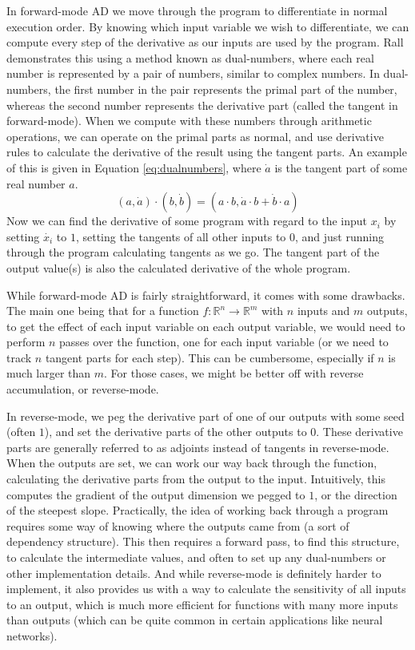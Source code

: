         In forward-mode AD we move through the program to differentiate in normal execution order.
        By knowing which input variable we wish to differentiate, we can compute every step of the derivative as our inputs are used by the program.
        Rall demonstrates this using a method known as dual-numbers, where each real number is represented by a pair of numbers, similar to complex numbers.
        In dual-numbers, the first number in the pair represents the primal part of the number, whereas the second number represents the derivative part (called the tangent in forward-mode).
        When we compute with these numbers through arithmetic operations, we can operate on the primal parts as normal, and use derivative rules to calculate the derivative of the result using the tangent parts.
        An example of this is given in Equation \ref{eq:dualnumbers}, where $\dot{a}$ is the tangent part of some real number $a$.
        \begin{equation} \label{eq:dualnumbers}
            (a,\dot{a})\cdot(b,\dot{b})=(a\cdot b, \dot{a}\cdot b+\dot{b}\cdot a)
        \end{equation}
        Now we can find the derivative of some program with regard to the input $x_i$ by setting $\dot{x_i}$ to $1$, setting the tangents of all other inputs to $0$, and just running through the program calculating tangents as we go.
        The tangent part of the output value(s) is also the calculated derivative of the whole program.

        While forward-mode AD is fairly straightforward, it comes with some drawbacks.
        The main one being that for a function $f:\mathbb{R}^n\to\mathbb{R}^m$ with $n$ inputs and $m$ outputs, to get the effect of each input variable on each output variable, we would need to perform $n$ passes over the function, one for each input variable (or we need to track $n$ tangent parts for each step).
        This can be cumbersome, especially if $n$ is much larger than $m$.
        For those cases, we might be better off with reverse accumulation, or reverse-mode.

        In reverse-mode, we peg the derivative part of one of our outputs with some seed (often $1$), and set the derivative parts of the other outputs to $0$.
        These derivative parts are generally referred to as adjoints instead of tangents in reverse-mode.
        When the outputs are set, we can work our way back through the function, calculating the derivative parts from the output to the input.
        Intuitively, this computes the gradient of the output dimension we pegged to $1$, or the direction of the steepest slope.
        Practically, the idea of working back through a program requires some way of knowing where the outputs came from (a sort of dependency structure).
        This then requires a forward pass, to find this structure, to calculate the intermediate values, and often to set up any dual-numbers or other implementation details.
        And while reverse-mode is definitely harder to implement, it also provides us with a way to calculate the sensitivity of all inputs to an output, which is much more efficient for functions with many more inputs than outputs (which can be quite common in certain applications like neural networks).

